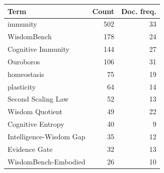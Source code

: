 \begin{tabular}{lrr}
\toprule
Term & Count & Doc. freq. \\
\midrule
immunity & 502 & 33 \\
WisdomBench & 178 & 24 \\
Cognitive Immunity & 144 & 27 \\
Ouroboros & 106 & 31 \\
homeostasis & 75 & 19 \\
plasticity & 64 & 14 \\
Second Scaling Law & 52 & 13 \\
Wisdom Quotient & 49 & 22 \\
Cognitive Entropy & 40 & 9 \\
Intelligence-Wisdom Gap & 35 & 12 \\
Evidence Gate & 32 & 13 \\
WisdomBench-Embodied & 26 & 10 \\
\bottomrule
\end{tabular}
